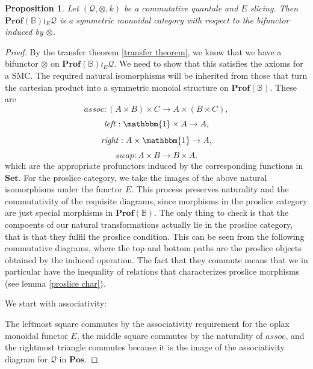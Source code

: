 \documentclass[12pt]{article}
\theoremstyle{definition}
\theoremstyle{plain}
\theoremstyle{plain}
\newtheorem{proposition}{Proposition}[section]
\theoremstyle{plain}
\theoremstyle{plain}
\theoremstyle{remark}
\theoremstyle{remark}
\newcommand{\mc}[1]{\mathcal{#1}}
\begin{document}
\begin{proposition}
	Let $(\mc{Q},\otimes, k)$ be a commutative quantale and $E$ slicing. Then $\mathbf{Prof}(\mathbb{B}) \wr_E \mc{Q}$ is a symmetric monoidal category with respect to the bifunctor induced by $\otimes$.
\end{proposition} 
\begin{proof}
	By the transfer theorem \ref{transfer theorem}, we know that we have a bifunctor $\otimes$ on $\mathbf{Prof}(\mathbb{B}) \wr_E \mc{Q}$. We need to show that this satisfies the axioms for a SMC. The required natural isomorphisms will be inherited from those that turn the cartesian product into a symmetric monoial structure on $\mathbf{Prof}(\mathbb{B})$. These are 
	\[\mathit{assoc}: (A \times B) \times C \rightarrow  A \times (B \times C), \]
	\[\mathit{left}: \mathbbm{1} \times A \rightarrow A, \]
	\[\mathit{right}: A \times \mathbbm{1} \rightarrow A, \]
	\[\mathit{swap}: A \times B \rightarrow B \times A. \]
	which are the appropriate profunctors induced by the corresponding functions in $\mathbf{Set}$. For the proslice category, we take the images of the above natural isomorphisms under the functor $E$. This process preserves naturality and the commutativity of the requisite diagrams, since morphisms in the proslice category are just special morphisms in $\mathbf{Prof}(\mathbb{B})$. The only thing to check is that the compoents of our natural transformations actually lie in the proslice category, that is that they fulfil the proslice condition. This can be seen from the following commutative diagrams, where the top and bottom paths are the proslice objects obtained by the induced operation. The fact that they commute means that we in particular have the inequality of relations that characterizes proslice morphisms (see lemma \ref{proslice char}).
	
	We start with associativity:
	\begin{center}
	\end{center}
	The leftmost square commutes by the associativity requirement for the oplax monoidal functor $E$, the middle square commutes by the naturality of $\mathit{assoc}$, and the rightmost triangle commutes because it is the image of the associativity diagram for $\mc{Q}$ in $\mathbf{Pos}$.
	

\end{proof}
\end{document}

